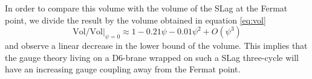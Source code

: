 In order to compare this volume with the volume of the SLag at the Fermat point, we divide
the result by the volume obtained in equation \eqref{eq:vol}
\begin{equation}
  \mathrm{Vol}/\mathrm{Vol}|_{\psi=0} \approx 1 - 0.21\psi - 0.01\psi^2 + O(\psi^3)
\end{equation}
and observe a linear decrease in the lower bound of the volume.
This implies that the gauge theory living on a D6-brane wrapped on such a SLag three-cycle will have an increasing gauge coupling away from the Fermat point.
